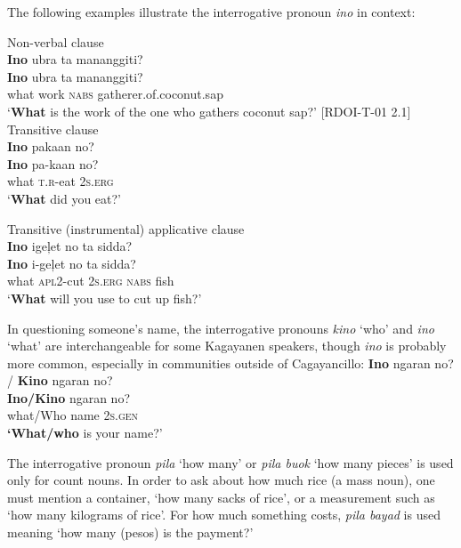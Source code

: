 The following examples illustrate the interrogative pronoun \textit{ino} in context:

\ea
Non-verbal clause \\
\textbf{Ino}  ubra  ta  mananggiti? \\\smallskip
 \gll \textbf{Ino}  ubra  ta  mananggiti? \\
what  work  \textsc{nabs}  gatherer.of.coconut.sap \\
\glt `\textbf{What} is the work of the one who gathers coconut sap?’ [RDOI-T-01 2.1]
\z
\ea
Transitive clause \\
\textbf{Ino}  pakaan  no? \\\smallskip
 \gll \textbf{Ino}  pa-kaan  no? \\
what  \textsc{t.}\textsc{r}-eat  2\textsc{s.erg} \\
\glt `\textbf{What} did you eat?’
\z

\ea
Transitive (instrumental) applicative clause \\
\textbf{Ino}  igeļet  no  ta  sidda? \\\smallskip
 \gll \textbf{Ino}  i-geļet  no  ta  sidda? \\
what  \textsc{apl2}-cut  2\textsc{s.erg}  \textsc{nabs}  fish \\
\glt `\textbf{What} will you use to cut up fish?’
\z

In questioning someone’s name, the interrogative pronouns \textit{kino} ‘who’ and \textit{ino} ‘what’ are interchangeable for some Kagayanen speakers, though \textit{ino} is probably more common, especially in communities outside of Cagayancillo:
\ea
\textbf{Ino}  ngaran  no? / \textbf{Kino}  ngaran  no? \\\smallskip
 \gll \textbf{Ino/Kino}  ngaran  no? \\
what/Who  name  2\textsc{s.gen} \\
\glt \textbf{‘What/who} is your name?’
\z

The interrogative pronoun \textit{pila} ‘how many’ or \textit{pila buok} ‘how many pieces’ is used only for count nouns. In order to ask about how much rice (a mass noun), one must mention a container, ‘how many sacks of rice’, or a measurement such as  ‘how many kilograms of rice’. For how much something costs, \textit{pila bayad} is used meaning ‘how many (pesos) is the payment?'

